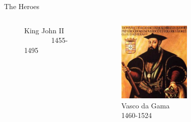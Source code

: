 \documentclass{beamer}
\begin{document}
\begin{frame}{The Heroes}
\begin{columns}
\begin{figure}[ht]
\begin{center}
    	\caption{\tiny King John II ~~~~~~~ 1455-1495}	
	\end{center}
	\end{figure}
	\begin{figure}[ht]
	\begin{center}
	\includegraphics[width=0.9 \columnwidth]{Vasco.jpg}
	\caption{\tiny Vasco da Gama ~~~ 1460-1524}		
	\end{center}
	\end{figure}
	\begin{figure}[ht]
	\begin{center}

\end{center}
\end{figure}
\end{columns}
\end{frame}
\end{document}
